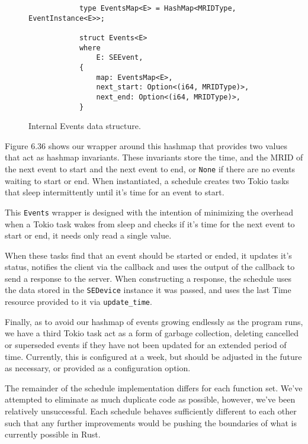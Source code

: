 \begin{figure}[h]
    \begin{center}
        \begin{lstlisting}
            type EventsMap<E> = HashMap<MRIDType, EventInstance<E>>;

            struct Events<E>
            where
                E: SEEvent,
            {
                map: EventsMap<E>,
                next_start: Option<(i64, MRIDType)>,
                next_end: Option<(i64, MRIDType)>,
            }
        \end{lstlisting}
        \label{fig:eventmapimpl}
        \vspace{-10pt}
        \caption{Internal Events data structure.}
    \end{center}
\end{figure}

Figure 6.36 shows our wrapper around this hashmap that provides two values that act as hashmap invariants. These invariants store the time, and the MRID of the next event to start and the next event to end, or \texttt{None} if there are no events waiting to start or end. When instantiated, a schedule creates two Tokio tasks that sleep intermittently until it's time for an event to start. 

This \texttt{Events} wrapper is designed with the intention of minimizing the overhead when a Tokio task wakes from sleep and checks if it's time for the next event to start or end, it needs only read a single value.

When these tasks find that an event should be started or ended, it updates it's status, notifies the client via the callback and uses the output of the callback to send a response to the server. When constructing a response, the schedule uses the data stored in the \texttt{SEDevice} instance it was passed, and uses the last Time resource provided to it via \texttt{update\_time}.

Finally, as to avoid our hashmap of events growing endlessly as the program runs, we have a third Tokio task act as a form of garbage collection, deleting cancelled or superseded events if they have not been updated for an extended period of time. Currently, this is configured at a week, but should be adjusted in the future as necessary, or provided as a configuration option.

The remainder of the schedule implementation differs for each function set. We've attempted to eliminate as much duplicate code as possible, however, we've been relatively unsuccessful. Each schedule behaves sufficiently different to each other such that any further improvements would be pushing the boundaries of what is currently possible in Rust.

